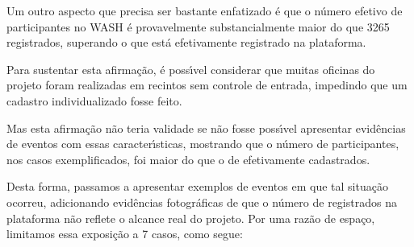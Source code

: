 \documentclass[
12pt,		%
openright,	%
twoside,  %
a4paper,			%
chapter=TITLE,		%
english,			%
french,				%
spanish,			%
brazil				%
]{USPSC-classe/USPSC_RedarTex}
\begin{document}
Um outro aspecto que precisa ser bastante enfatizado \'e que o n\'umero efetivo de participantes no WASH \'e provavelmente substancialmente maior do que 3265 registrados, superando o que est\'a efetivamente registrado na plataforma.








Para sustentar esta afirma\c{c}\~ao, \'e poss\'{\i}vel considerar que muitas oficinas do projeto foram realizadas em recintos sem controle de entrada, impedindo que um cadastro individualizado fosse feito.








Mas esta afirma\c{c}\~ao n\~ao teria validade se n\~ao fosse poss\'{\i}vel apresentar evid\^encias de eventos com essas caracter\'{\i}sticas, mostrando que o n\'umero de participantes, nos casos exemplificados, foi maior do que o de efetivamente cadastrados.








Desta forma, passamos a apresentar exemplos de eventos em que tal situa\c{c}\~ao ocorreu, adicionando evid\^encias fotogr\'aficas de que o n\'umero de registrados na plataforma n\~ao reflete o alcance real do projeto. Por uma raz\~ao de espa\c{c}o, limitamos essa exposi\c{c}\~ao a 7 casos, como segue:
\end{document}
